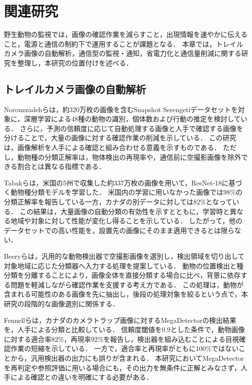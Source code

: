 \chapter{関連研究}
\label{chap:related}

野生動物の監視では，画像の確認作業を減らすこと，出現情報を速やかに伝えること，電源と通信の制約下で運用することが課題となる．
本章では，トレイルカメラ画像の自動解析，通信型の監視・通知，省電力化と通信量削減に関する研究を整理し，本研究の位置付けを述べる．

\section{トレイルカメラ画像の自動解析}
Norouzzadehら\cite{Norouzzadeh2018}は，約320万枚の画像を含むSnapshot Serengetiデータセットを対象に，深層学習による48種の動物の識別，個体数および行動の推定を検討している．
さらに，予測の信頼度に応じて自動処理する画像と人手で確認する画像を分けることで，大量の画像に対する確認作業の削減を示している．
この研究は，画像解析を人手による確認と組み合わせる意義を示すものである．
ただし，動物種の分類正解率は，物体検出の再現率や，通信前に空撮影画像を除外できる割合とは異なる指標である．

Tabakら\cite{Tabak2019}は，米国の5州で収集した約337万枚の画像を用いて，ResNet-18に基づく動物種分類モデルを学習した．
米国内の学習に用いなかった画像では98\%の分類正解率を報告している一方，カナダの別データに対しては82\%となっている．
この結果は，大量画像の自動分類の有効性を示すとともに，学習時と異なる地域や対象に対して性能が変化し得ることを示している．
したがって，他のデータセットでの高い性能を，設置先の画像にそのまま適用できるとは限らない．

Beeryら\cite{Beery2019}は，汎用的な動物検出器で空撮影画像を選別し，検出領域を切り出して対象地域に応じた分類器へ入力する処理を提案している．
動物の位置検出と種分類を分離することにより，画像全体を直接分類する場合に比べ，背景に依存する問題を軽減しながら確認作業を支援する考え方である．
この処理は，動物が含まれる可能性のある画像を先に抽出し，後段の処理対象を絞るという点で，本研究の段階的な画像選別に関係する．

Fennellら\cite{Fennell2022}は，カナダのカメラトラップ画像に対するMegaDetectorの検出結果を，人手による分類と比較している．
信頼度閾値を0.9とした条件で，動物画像に対する適合率82\%，再現率92\%を報告し，検出器を組み込むことによる目視確認作業の短縮を示している．
一方で，適合率と再現率がともに100\%ではないことから，汎用検出器の出力にも誤りが含まれる．
本研究においてMegaDetectorを再判定や参照評価に用いる場合にも，その出力を無条件に正解とみなさず，人手による確認との違いを明確にする必要がある．

